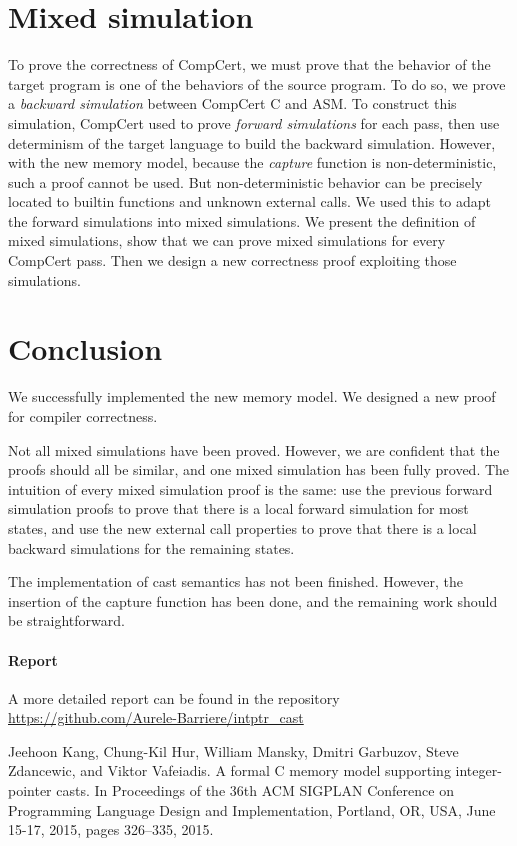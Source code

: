 \documentclass[nocopyrightspace]{sigplanconf}
\begin{document}
\section{Mixed simulation}
To prove the correctness of CompCert, we must prove that the behavior of the target program is one of the behaviors of the source program. To do so, we prove a \textit{backward simulation} between CompCert C and ASM. To construct this simulation, CompCert used to prove \textit{forward simulations} for each pass, then use determinism of the target language to build the backward simulation.
However, with the new memory model, because the \textit{capture} function is non-deterministic, such a proof cannot be used. But non-deterministic behavior can be precisely located to builtin functions and unknown external calls. We used this to adapt the forward simulations into mixed simulations. We present the definition of mixed simulations, show that we can prove mixed simulations for every CompCert pass. Then we design a new correctness proof exploiting those simulations.

\section{Conclusion}
We successfully implemented the new memory model.
We designed a new proof for compiler correctness.

Not all mixed simulations have been proved. However, we are confident that the proofs should all be similar, and one mixed simulation has been fully proved. The intuition of every mixed simulation proof is the same: use the previous forward simulation proofs to prove that there is a local forward simulation for most states, and use the new external call properties to prove that there is a local backward simulations for the remaining states.

The implementation of cast semantics has not been finished. However, the insertion of the capture function has been done, and the remaining work should be straightforward.

\paragraph{Report}
A more detailed report can be found in the repository \url{https://github.com/Aurele-Barriere/intptr_cast}







\begin{thebibliography}{00}
 Jeehoon Kang, Chung-Kil Hur, William Mansky, Dmitri Garbuzov, Steve Zdancewic, and Viktor Vafeiadis. A formal C memory model supporting integer-pointer casts. In Proceedings of the 36th ACM SIGPLAN Conference on Programming Language Design and Implementation, Portland, OR, USA, June 15-17, 2015, pages 326–335, 2015.
\end{thebibliography}
\end{document}
